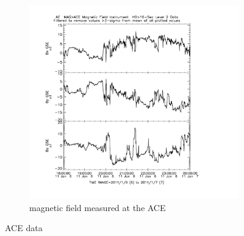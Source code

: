 \documentclass[10pt,a4paper]{article}
\begin{document}
\begin{figure}[h]
\begin{subfigure}{0.45\textwidth}
\includegraphics[width=\textwidth]{ACE_magneticfield.pdf}
\caption{magnetic field measured at the ACE}
\end{subfigure}
\caption{ACE data}
\end{figure}
\end{document}
